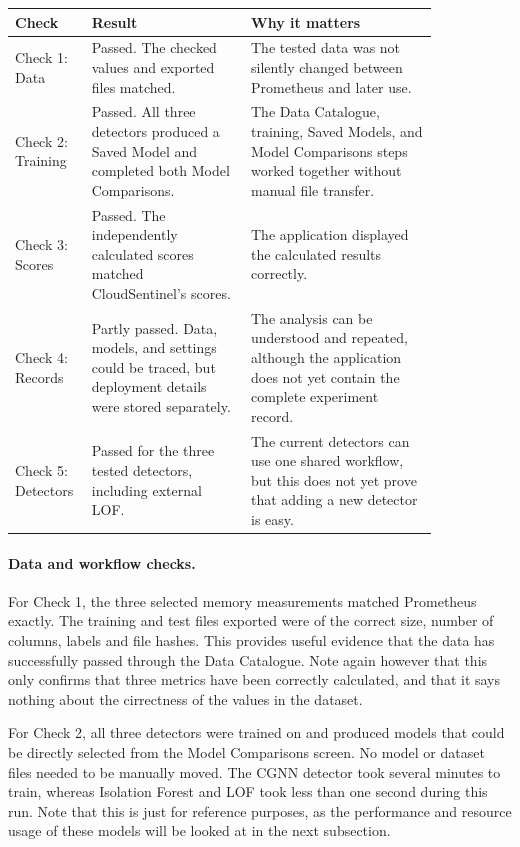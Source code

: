 \begin{center}
\small
\begin{tabular}{|p{0.10\linewidth}|p{0.34\linewidth}|p{0.40\linewidth}|}
\hline
Check & Result & Why it matters \\
\hline
Check 1: Data & Passed. The checked values and exported files matched. & The tested data was not silently changed between Prometheus and later use. \\
\hline
Check 2: Training & Passed. All three detectors produced a Saved Model and completed both Model Comparisons. & The Data Catalogue, training, Saved Models, and Model Comparisons steps worked together without manual file transfer. \\
\hline
Check 3: Scores & Passed. The independently calculated scores matched CloudSentinel's scores. & The application displayed the calculated results correctly. \\
\hline
Check 4: Records & Partly passed. Data, models, and settings could be traced, but deployment details were stored separately. & The analysis can be understood and repeated, although the application does not yet contain the complete experiment record. \\
\hline
Check 5: Detectors & Passed for the three tested detectors, including external LOF. & The current detectors can use one shared workflow, but this does not yet prove that adding a new detector is easy. \\
\hline
\end{tabular}
\end{center}

\paragraph{Data and workflow checks.}
For Check 1, the three selected memory measurements matched Prometheus exactly. The training and test files exported were of the correct size, number of columns, labels and file hashes. This provides useful evidence that the data has successfully passed through the Data Catalogue. Note again however that this only confirms that three metrics have been correctly calculated, and that it says nothing about the cirrectness of the values in the dataset.

For Check 2, all three detectors were trained on and produced models that could be directly selected from the Model Comparisons screen. No model or dataset files needed to be manually moved. The CGNN detector took several minutes to train, whereas Isolation Forest and LOF took less than one second during this run. Note that this is just for reference purposes, as the performance and resource usage of these models will be looked at in the next subsection.

